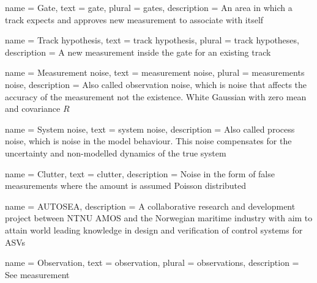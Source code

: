 {
	name 		= Gate,
	text 		= gate,
	plural		= gates,
	description = {An area in which a track expects and approves new measurement to associate with itself}
}

{
	name 		= {Track hypothesis},
	text 		= {track hypothesis},
	plural		= {track hypotheses},
	description = {A new measurement inside the gate for an existing track}
}

{
	name 		= {Measurement noise},
	text 		= {measurement noise},
	plural		= {measurements noise},
	description = {Also called observation noise, which is noise that affects the accuracy of the measurement not the existence. White Gaussian with zero mean and covariance \(R\)}
}

{
	name 		= {System noise},
	text 		= {system noise}, 
	description = {Also called process noise, which is noise in the model behaviour. This noise compensates for the uncertainty and non-modelled dynamics of the true system}
}

{
	name 		= Clutter,
	text 		= clutter,
	description = {Noise in the form of false measurements where the amount is assumed Poisson distributed}
}

{
	name = {AUTOSEA},
	description = {A collaborative research and development project between NTNU AMOS  and the Norwegian maritime industry with aim to attain world leading knowledge in design and verification of control systems for ASVs}
}

{
	name 		= Observation,
	text 		= observation,
	plural 		= observations,
	description = {See \Gls{measurement}}
}